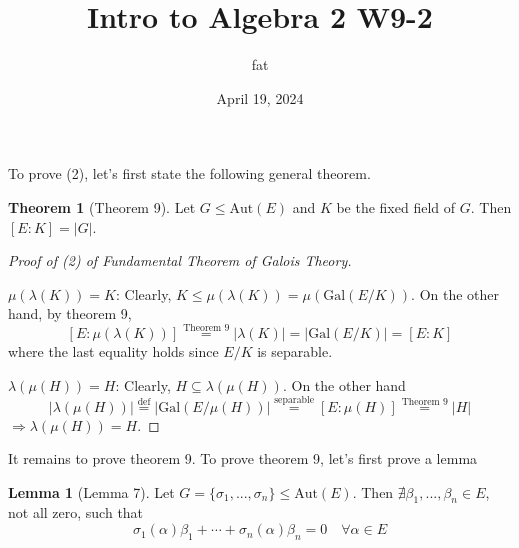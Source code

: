 \documentclass{article}
\title{Intro to Algebra 2 W9-2}
\author{fat}
\date{April 19, 2024}
\theoremstyle{definition}
\newtheorem{thm}{Theorem}
\newtheorem{lem}{Lemma}
\newenvironment{proofs}[1][\proofname]{%
  \begin{proof}[#1]$ $\par\nobreak\ignorespaces
}{%
  \end{proof}
}
\newcommand{\Ra}{\Rightarrow}
\begin{document}
\maketitle
\thispagestyle{fancy}
\renewcommand{\footrulewidth}{0.4pt}
\cfoot{\thepage}
\renewcommand{\headrulewidth}{0.4pt}

To prove (2), let's first state the following general theorem.

\begin{thm}[Theorem 9]
	Let $G \leq \text{Aut}(E)$ and $K$ be the fixed field of $G$.
	Then $[E:K] = |G|$.
\end{thm}

\begin{proofs}[Proof of (2) of Fundamental Theorem of Galois Theory]
	$\mu(\lambda(K)) = K$: Clearly, $K \leq \mu(\lambda(K)) = \mu(\text{Gal}(E/K))$.
	On the other hand, by theorem 9, 
	\[
		[E:\mu(\lambda(K))] \stackrel{\text{Theorem 9}}{=} |\lambda(K)| = |\text{Gal}(E/K)| = [E:K]
	\]
	where the last equality holds since $E/K$ is separable.

	\par $\lambda(\mu(H)) = H$: Clearly, $H \subseteq \lambda(\mu(H))$.
	On the other hand
	\[
		|\lambda(\mu(H))| \stackrel{\text{def}}{=} |\text{Gal}(E/\mu(H))| \stackrel{\text{separable}}{=} [E:\mu(H)] \stackrel{\text{Theorem 9}}{=} |H|
	\]
	$\Ra \lambda(\mu(H)) = H$.
\end{proofs}

It remains to prove theorem 9.
To prove theorem 9, let's first prove a lemma

\begin{lem}[Lemma 7]
	Let $G = \{\sigma_1, ..., \sigma_n\} \leq \text{Aut}(E)$.
	Then $\nexists \beta_1, ..., \beta_n \in E$, not all zero, such that
	\[
		\sigma_1(\alpha) \beta_1 + \cdots + \sigma_n(\alpha) \beta_n = 0 \quad \forall \alpha \in E
	\]
\end{lem}
\end{document}

